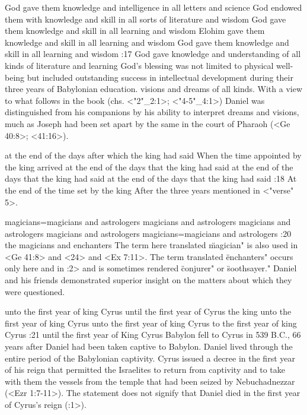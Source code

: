     {God gave them knowledge and intelligence in all letters and science} %
    {God endowed them with knowledge and skill in all sorts of literature and wisdom} %
    {God gave them knowledge and skill in all learning and wisdom} %
    {Elohim gave them knowledge and skill in all learning and wisdom} %
    {God gave them knowledge and skill in all learning and wisdom} %
:17 {God gave knowledge and understanding of all kinds of literature and learning} God's
blessing was not limited to physical 
well-being but included outstanding success in intellectual development during their three years of
Babylonian education. visions and dreams of all kinds. With a view to what follows in the book
(chs. <"2"_2:1>; <"4-5"_4:1>) Daniel was distinguished from his companions by his ability to interpret dreams and
visions, much as Joseph had been set apart by the same in the court of Pharaoh (<Ge 40:8>;
<41:16>).



    {at the end of the days after which the king had said} %
    {When the time appointed by the king arrived} %
    {at the end of the days that the king had said} %
    {at the end of the days that the king had said} %
    {at the end of the days that the king had said} %
:18 {At the end of the time set by the king} After the three years mentioned in <"verse" 5>.



    {magicians}={magicians and astrologers} %
    {magicians and astrologers} %
    {magicians and astrologers} %
    {magicians and astrologers} %
    {magicians}={magicians and astrologers} %
:20 {the magicians and enchanters} The term here translated \"magician" is also used in
<Ge 41:8> and <24> and <Ex 7:11>. The term translated \"enchanters" occurs only here and in :2> and is
sometimes rendered \"conjurer" or \"soothsayer." Daniel and his friends demonstrated superior insight
on the matters about which they were questioned.

    {unto the first year of king Cyrus} %
    {until the first year of Cyrus the king} %
    {unto the first year of king Cyrus} %
    {unto the first year of king Cyrus} %
    {to the first year of king Cyrus} %
:21 {until the first year of King Cyrus} Babylon
fell to Cyrus in 539 B.C., 66 years after Daniel had been taken captive to Babylon. Daniel lived
through the entire period of the Babylonian captivity. Cyrus issued a decree in the first year of
his reign that permitted the Israelites to return from captivity and to take with them the vessels
from the temple that had been seized by Nebuchadnezzar (<Ezr 1:7-11>). The statement does not signify
that Daniel died in the first year of Cyrus's reign (:1>).

